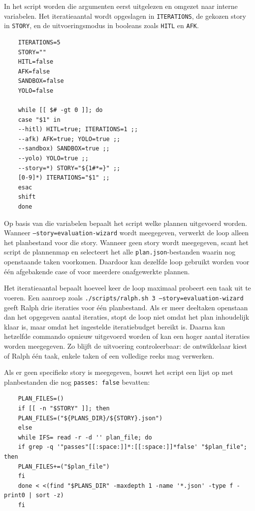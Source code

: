 In het script worden die argumenten eerst uitgelezen en omgezet naar interne variabelen. Het iteratieaantal wordt opgeslagen in \texttt{ITERATIONS}, de gekozen story in \texttt{STORY}, en de uitvoeringsmodus in booleans zoals \texttt{HITL} en \texttt{AFK}.

\begin{verbatim}
    ITERATIONS=5
    STORY=""
    HITL=false
    AFK=false
    SANDBOX=false
    YOLO=false
    
    while [[ $# -gt 0 ]]; do
    case "$1" in
    --hitl) HITL=true; ITERATIONS=1 ;;
    --afk) AFK=true; YOLO=true ;;
    --sandbox) SANDBOX=true ;;
    --yolo) YOLO=true ;;
    --story=*) STORY="${1#*=}" ;;
    [0-9]*) ITERATIONS="$1" ;;
    esac
    shift
    done
\end{verbatim}

Op basis van die variabelen bepaalt het script welke plannen uitgevoerd worden. Wanneer \texttt{--story=evaluation-wizard} wordt meegegeven, verwerkt de loop alleen het planbestand voor die story. Wanneer geen story wordt meegegeven, scant het script de plannenmap en selecteert het alle \texttt{plan.json}-bestanden waarin nog openstaande taken voorkomen. Daardoor kan dezelfde loop gebruikt worden voor één afgebakende case of voor meerdere onafgewerkte plannen.

Het iteratieaantal bepaalt hoeveel keer de loop maximaal probeert een taak uit te voeren. Een aanroep zoals \texttt{./scripts/ralph.sh 3 --story=evaluation-wizard} geeft Ralph drie iteraties voor één planbestand. Als er meer deeltaken openstaan dan het opgegeven aantal iteraties, stopt de loop niet omdat het plan inhoudelijk klaar is, maar omdat het ingestelde iteratiebudget bereikt is. Daarna kan hetzelfde commando opnieuw uitgevoerd worden of kan een hoger aantal iteraties worden meegegeven. Zo blijft de uitvoering controleerbaar: de ontwikkelaar kiest of Ralph één taak, enkele taken of een volledige reeks mag verwerken.

Als er geen specifieke story is meegegeven, bouwt het script een lijst op met planbestanden die nog \texttt{passes: false} bevatten:

\begin{verbatim}
    PLAN_FILES=()
    if [[ -n "$STORY" ]]; then
    PLAN_FILES=("${PLANS_DIR}/${STORY}.json")
    else
    while IFS= read -r -d '' plan_file; do
    if grep -q '"passes"[[:space:]]*:[[:space:]]*false' "$plan_file"; then
    PLAN_FILES+=("$plan_file")
    fi
    done < <(find "$PLANS_DIR" -maxdepth 1 -name '*.json' -type f -print0 | sort -z)
    fi
\end{verbatim}

